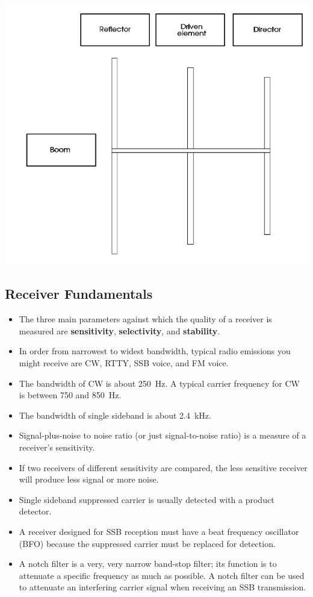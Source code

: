\documentclass[letterpaper,12pt]{scrartcl}
\begin{document}
\includegraphics[width=150mm]{yagi-uda.png}

\subsection{Receiver Fundamentals}

\begin{itemize}
\item The three main parameters against which the quality of a receiver is measured are \textbf{sensitivity}, \textbf{selectivity}, and \textbf{stability}.
\item In order from narrowest to widest bandwidth, typical radio emissions you might receive are CW, RTTY, SSB voice, and FM voice.
\item The bandwidth of CW is about 250~Hz. A typical carrier frequency for CW is between 750 and 850~Hz.
\item The bandwidth of single sideband is about 2.4~kHz.
\item Signal-plus-noise to noise ratio (or just signal-to-noise ratio) is a measure of a receiver's sensitivity.
\item If two receivers of different sensitivity are compared, the less sensitive receiver will produce less signal or more noise.
\item Single sideband suppressed carrier is usually detected with a product detector.
\item A receiver designed for SSB reception must have a beat frequency oscillator (BFO) because the suppressed carrier must be replaced for detection.
\item A notch filter is a very, very narrow band-stop filter; its function is to attenuate a specific frequency as much as possible.
A notch filter can be used to attenuate an interfering carrier signal when receiving an SSB transmission.
\end{itemize}
\end{document}
